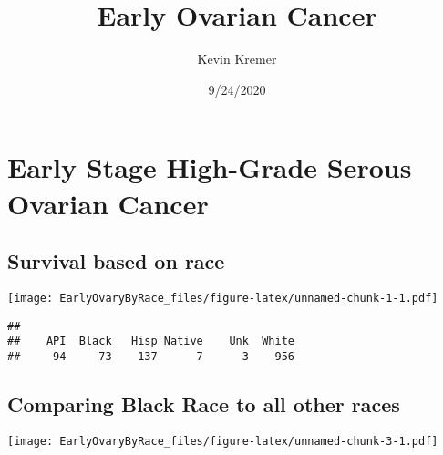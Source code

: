 \documentclass[
]{article}
\title{Early Ovarian Cancer}
\author{Kevin Kremer}
\date{9/24/2020}
\newenvironment{Shaded}{\begin{snugshade}}{\end{snugshade}}
\newcommand{\DataTypeTok}[1]{\textcolor[rgb]{0.13,0.29,0.53}{#1}}
\newcommand{\KeywordTok}[1]{\textcolor[rgb]{0.13,0.29,0.53}{\textbf{#1}}}
\newcommand{\NormalTok}[1]{#1}
\newcommand{\OperatorTok}[1]{\textcolor[rgb]{0.81,0.36,0.00}{\textbf{#1}}}
\newcommand{\StringTok}[1]{\textcolor[rgb]{0.31,0.60,0.02}{#1}}
\begin{document}
\maketitle

\hypertarget{early-stage-high-grade-serous-ovarian-cancer}{%
\section{Early Stage High-Grade Serous Ovarian
Cancer}\label{early-stage-high-grade-serous-ovarian-cancer}}

\hypertarget{survival-based-on-race}{%
\subsection{Survival based on race}\label{survival-based-on-race}}

\texttt{[image: EarlyOvaryByRace\_files/figure-latex/unnamed-chunk-1-1.pdf]}

\begin{Shaded}
\end{Shaded}

\begin{verbatim}
## 
##    API  Black   Hisp Native    Unk  White 
##     94     73    137      7      3    956
\end{verbatim}

\hypertarget{comparing-black-race-to-all-other-races}{%
\subsection{Comparing Black Race to all other
races}\label{comparing-black-race-to-all-other-races}}

\texttt{[image: EarlyOvaryByRace\_files/figure-latex/unnamed-chunk-3-1.pdf]}

\begin{Shaded}
\end{Shaded}
\end{document}
